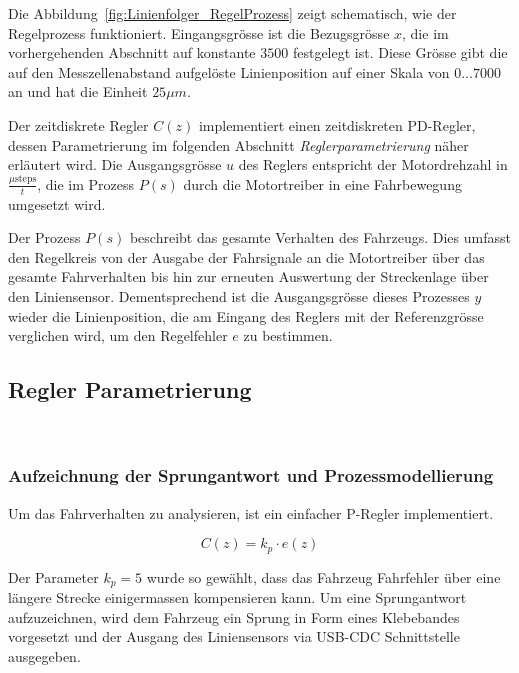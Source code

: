 \documentclass[main.tex]{subfiles} %
\begin{document}
Die Abbildung~\ref{fig:Linienfolger_RegelProzess} zeigt schematisch, wie der
Regelprozess funktioniert. Eingangsgrösse ist die Bezugsgrösse $x$, die im
vorhergehenden Abschnitt auf konstante $3500$ festgelegt ist. Diese Grösse gibt
die auf den Messzellenabstand aufgelöste Linienposition auf einer Skala von $0
    \dots 7000$ an und hat die Einheit $25\mu m$.

Der zeitdiskrete Regler $C(z)$ implementiert einen zeitdiskreten PD-Regler,
dessen Parametrierung im folgenden Abschnitt \textit{Reglerparametrierung}
näher erläutert wird. Die Ausgangsgrösse $u$ des Reglers entspricht der
Motordrehzahl in $\frac{\mu \text{steps}}{t}$, die im Prozess $P(s)$ durch die
Motortreiber in eine Fahrbewegung umgesetzt wird.

Der Prozess $P(s)$ beschreibt das gesamte Verhalten des Fahrzeugs. Dies umfasst
den Regelkreis von der Ausgabe der Fahrsignale an die Motortreiber über das
gesamte Fahrverhalten bis hin zur erneuten Auswertung der Streckenlage über den
Liniensensor. Dementsprechend ist die Ausgangsgrösse dieses Prozesses $y$
wieder die Linienposition, die am Eingang des Reglers mit der Referenzgrösse
verglichen wird, um den Regelfehler $e$ zu bestimmen.

\subsection*{Regler Parametrierung}~\label{apdx:Regler_Parametrierung}

\subsubsection*{Aufzeichnung der Sprungantwort und Prozessmodellierung}

Um das Fahrverhalten zu analysieren, ist ein einfacher P-Regler implementiert.

\[
    C(z) = k_p \cdot e(z)
\]

Der Parameter $k_p = 5$ wurde so gewählt, dass das Fahrzeug Fahrfehler über
eine längere Strecke einigermassen kompensieren kann. Um eine Sprungantwort
aufzuzeichnen, wird dem Fahrzeug ein Sprung in Form eines Klebebandes
vorgesetzt und der Ausgang des Liniensensors via USB-CDC Schnittstelle
ausgegeben.
\end{document}
